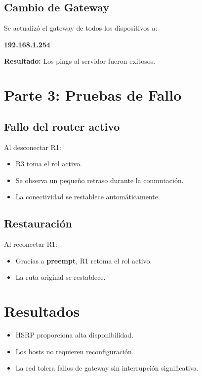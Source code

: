 \documentclass[12pt]{article}
\begin{document}
\subsection{Cambio de Gateway}

Se actualizó el gateway de todos los dispositivos a:

\begin{center}
\textbf{192.168.1.254}
\end{center}

\textbf{Resultado:}  
Los pings al servidor fueron exitosos.

\section{Parte 3: Pruebas de Fallo}

\subsection{Fallo del router activo}

Al desconectar R1:
\begin{itemize}
    \item R3 toma el rol activo.
    \item Se observa un pequeño retraso durante la conmutación.
    \item La conectividad se restablece automáticamente.
\end{itemize}

\subsection{Restauración}

Al reconectar R1:
\begin{itemize}
    \item Gracias a \textbf{preempt}, R1 retoma el rol activo.
    \item La ruta original se restablece.
\end{itemize}

\section{Resultados}

\begin{itemize}
    \item HSRP proporciona alta disponibilidad.
    \item Los hosts no requieren reconfiguración.
    \item La red tolera fallos de gateway sin interrupción significativa.
\end{itemize}
\end{document}

